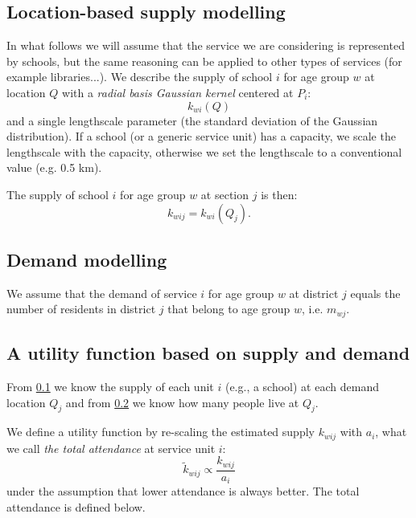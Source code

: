 \documentclass{article}
\begin{document}
\subsection{Location-based supply modelling} \label{supply}
In what follows we will assume that the service we are considering is represented by schools, but the same reasoning can be applied to other types of services (for example libraries...).
We describe the supply of school $i$ for age group $w$ at location $Q$ with a \textit{radial basis Gaussian kernel}  centered at $P_i$: 
\[k_{wi}(Q)\]
and a single lengthscale parameter (the standard deviation of the Gaussian distribution). If a school (or a generic service unit) has a capacity, we scale the lengthscale with the capacity, otherwise we set the lengthscale to a conventional value (e.g. 0.5 km).

The supply of school $i$ for age group $w$ at section $j$ is then:
\[k_{wij}=k_{wi}(Q_j).\]

\subsection{Demand modelling}  \label{demand}
We assume that the demand of service $i$ for age group $w$ at district $j$ equals the number of residents in district $j$ that belong to age group $w$, i.e. $m_{wj}$.

\subsection{A utility function based on supply and demand}
From \ref{supply} we know the supply of each unit $i$ (e.g., a school) at each demand location $Q_j$ and from \ref{demand} we know how many people live at $Q_j$. 

We define a utility function by re-scaling the estimated supply $k_{wij}$ with $a_i$, what we call \textit{the total attendance} at service unit $i$:
 \[\widetilde{k}_{wij} \propto \frac{k_{wij}}{a_i}\]
under the assumption that lower attendance is always better. The total attendance is defined below.
\end{document}
